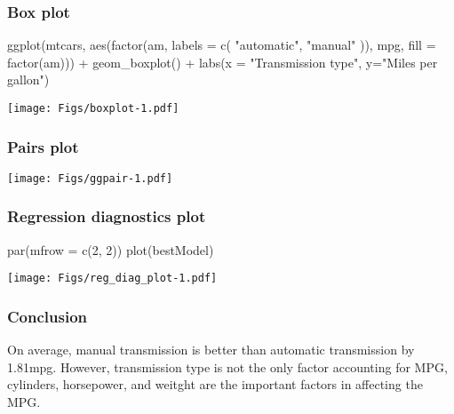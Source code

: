 \documentclass[
]{article}
\newenvironment{Shaded}{\begin{snugshade}}{\end{snugshade}}
\newcommand{\AttributeTok}[1]{\textcolor[rgb]{0.77,0.63,0.00}{#1}}
\newcommand{\DecValTok}[1]{\textcolor[rgb]{0.00,0.00,0.81}{#1}}
\newcommand{\FunctionTok}[1]{\textcolor[rgb]{0.00,0.00,0.00}{#1}}
\newcommand{\NormalTok}[1]{#1}
\newcommand{\SpecialCharTok}[1]{\textcolor[rgb]{0.00,0.00,0.00}{#1}}
\newcommand{\StringTok}[1]{\textcolor[rgb]{0.31,0.60,0.02}{#1}}
\begin{document}
\hypertarget{box-plot}{%
\subsubsection{Box plot}\label{box-plot}}

\begin{Shaded}
\begin{Highlighting}[]
\FunctionTok{ggplot}\NormalTok{(mtcars, }\FunctionTok{aes}\NormalTok{(}\FunctionTok{factor}\NormalTok{(am, }\AttributeTok{labels =} \FunctionTok{c}\NormalTok{(}
    \StringTok{"automatic"}\NormalTok{, }\StringTok{"manual"}
\NormalTok{)), mpg, }\AttributeTok{fill =} \FunctionTok{factor}\NormalTok{(am))) }\SpecialCharTok{+}
    \FunctionTok{geom\_boxplot}\NormalTok{() }\SpecialCharTok{+}
    \FunctionTok{labs}\NormalTok{(}\AttributeTok{x =} \StringTok{"Transmission type"}\NormalTok{, }\AttributeTok{y=}\StringTok{"Miles per gallon"}\NormalTok{)}
\end{Highlighting}
\end{Shaded}

\texttt{[image: Figs/boxplot-1.pdf]}

\pagebreak

\hypertarget{pairs-plot}{%
\subsubsection{Pairs plot}\label{pairs-plot}}

\texttt{[image: Figs/ggpair-1.pdf]}

\hypertarget{regression-diagnostics-plot}{%
\subsubsection{Regression diagnostics
plot}\label{regression-diagnostics-plot}}

\begin{Shaded}
\begin{Highlighting}[]
\FunctionTok{par}\NormalTok{(}\AttributeTok{mfrow =} \FunctionTok{c}\NormalTok{(}\DecValTok{2}\NormalTok{, }\DecValTok{2}\NormalTok{))}
\FunctionTok{plot}\NormalTok{(bestModel)}
\end{Highlighting}
\end{Shaded}

\texttt{[image: Figs/reg\_diag\_plot-1.pdf]}

\hypertarget{conclusion}{%
\subsubsection{Conclusion}\label{conclusion}}

On average, manual transmission is better than automatic transmission by
1.81mpg. However, transmission type is not the only factor accounting
for MPG, cylinders, horsepower, and weitght are the important factors in
affecting the MPG.
\end{document}
